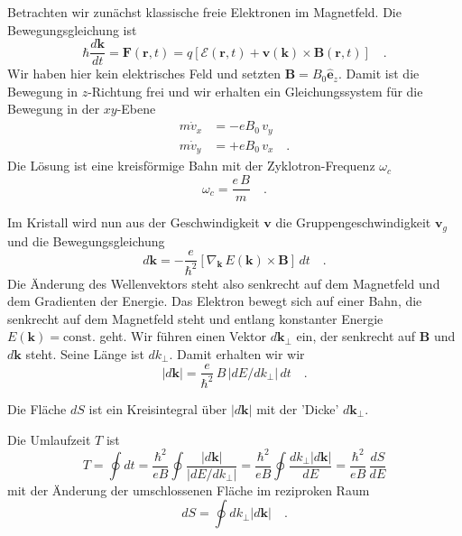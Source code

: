 Betrachten wir zunächst klassische freie Elektronen im Magnetfeld. Die Bewegungsgleichung ist 
\begin{equation}
   \hbar \frac{d \mathbf{k}}{dt} = \mathbf{F}(\mathbf{r}, t) = q \left[ \bm{\mathcal{E}}(\mathbf{r}, t) +   \mathbf{v}(\mathbf{k}) \times \mathbf{B}(\mathbf{r}, t)\right]  \quad .
\end{equation}
Wir haben hier kein elektrisches Feld und setzten $\mathbf{B} = B_0 \hat{\mathbf{e}}_z$. Damit ist die Bewegung in $z$-Richtung frei und wir erhalten ein Gleichungssystem für die Bewegung in der $xy$-Ebene
\begin{align}
   m \dot{v}_x & = -e B_0 \, v_y \\
   m \dot{v}_y & = +e B_0 \, v_x  \quad .
\end{align}
Die Lösung ist eine kreisförmige Bahn mit der Zyklotron-Frequenz $\omega_c$
\begin{equation}
   \omega_c = \frac{e \, B }{m} \quad .
\end{equation}

Im Kristall wird nun aus der Geschwindigkeit $\mathbf{v}$ die Gruppengeschwindigkeit $\mathbf{v}_g$ und die Bewegungsgleichung
\begin{equation}
   d\mathbf{k} = - \frac{e}{\hbar^2} \left[ \nabla_\mathbf{k}\, E(\mathbf{k}) \times \mathbf{B} \right] \, dt  \quad .
\end{equation}
Die Änderung des Wellenvektors steht also senkrecht auf dem Magnetfeld und dem Gradienten der Energie. Das Elektron bewegt sich auf einer Bahn, die senkrecht auf dem Magnetfeld steht und entlang konstanter Energie $E(\mathbf{k}) = \text{const.}$ geht. Wir führen einen Vektor $d\mathbf{k}_\perp$ ein, der senkrecht auf $\mathbf{B}$ und  $d\mathbf{k}$ steht. Seine Länge ist $dk_\perp$. Damit erhalten wir wir 
\begin{equation}
   |d\mathbf{k}|  =  \frac{e}{\hbar^2} \, B \, |d E /dk_\perp | \, dt  \quad .
\end{equation}
%
\begin{marginfigure}
   \caption{Die Fläche $dS$ ist ein Kreisintegral über $|d\mathbf{k}|$ mit der 'Dicke' $d\mathbf{k}_\perp$.}
\end{marginfigure}

Die Umlaufzeit $T$ ist
\begin{equation}
   T = \oint dt =  \frac{\hbar^2}{e B } \oint \frac{ |d\mathbf{k}|  }{|d E /dk_\perp |}
   =  \frac{\hbar^2}{e B } \oint \frac{dk_\perp  |d\mathbf{k}| }{d E } 
   = \frac{\hbar^2}{e B } \, \frac{dS}{dE} \label{eq:4_t_zykl}
\end{equation}
mit der Änderung der umschlossenen Fläche im reziproken Raum 
\begin{equation}
   dS = \oint dk_\perp  |d\mathbf{k}|  \quad .
\end{equation}



